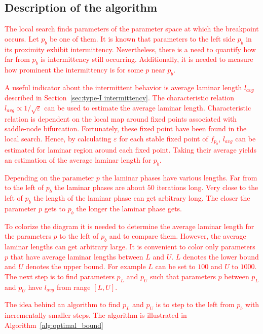 \subsection{Description of the algorithm}
\textcolor{red}{
The local search finds parameters of the parameter space at which the breakpoint occurs.
Let $p_b$ be one of them.
It is known that parameters to the left side $p_b$ in its proximity exhibit intermittency.
Nevertheless, there is a need to quantify how far from $p_b$ is intermittency still occurring.
Additionally, it is needed to measure how prominent the intermittency is for some $p$ near $p_b$.
}
\par
\textcolor{red}{
A useful indicator about the intermittent behavior is average laminar length $l_{avg}$ described in Section~\ref{sec:type-I intermittency}.
The characteristic relation $l_{avg} \varpropto 1 / \sqrt{\varepsilon}$ can be used to estimate the average laminar length.
Characteristic relation is dependent on the local map around fixed points associated with saddle-node bifurcation.
Fortunately, these fixed point have been found in the local search.
Hence, by calculating $\varepsilon$ for each stable fixed point of $f_{p_b}$, $l_{avg}$ can be estimated for laminar region around each fixed point.
Taking their average yields an estimation of the average laminar length for $p_b$.
}
\par
\textcolor{red}{
Depending on the parameter $p$ the laminar phases have various lengths.
Far from to the left of $p_b$ the laminar phases are about $50$ iterations long.
Very close to the left of $p_b$ the length of the laminar phase can get arbitrary long.
The closer the parameter $p$ gets to $p_b$ the longer the laminar phase gets.
}
\par
\textcolor{red}{
To colorize the diagram it is needed to determine the average laminar length for the parameters $p$ to the left of $p_b$ and to compare them.
However, the average laminar lengths can get arbitrary large.
It is convenient to color only parameters $p$ that have average laminar lengths between $L$ and $U$. 
$L$ denotes the lower bound and $U$ denotes the upper bound.
For example $L$ can be set to $100$ and $U$ to $1000$.
The next step is to find parameters $p_L$ and $p_U$ such that parameters $p$ between $p_L$ and $p_U$ have $l_{avg}$ from range $[ L, U ]$.
}
\par
\textcolor{red}{
The idea behind an algorithm to find $p_L$ and $p_U$ is to step to the left from $p_b$ with incrementally smaller steps.
The algorithm is illustrated in Algorithm~\ref{alg:optimal_bound}
}


